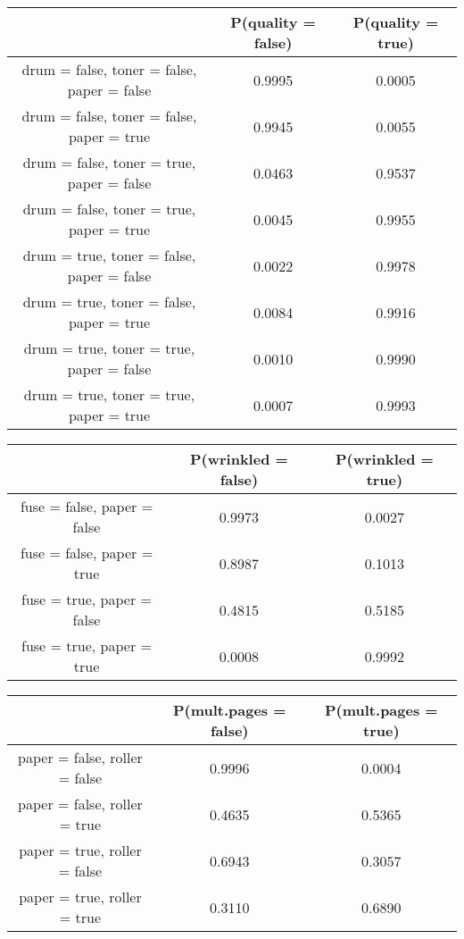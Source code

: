 \begin{table}[h!]
	\begin{tabular}{|c|c|c|}
		\hline
		& P(quality = false) & P(quality = true) \\ \hline
		drum = false, toner = false, paper = false & 0.9995 & 0.0005 \\ \hline
		drum = false, toner = false, paper = true & 0.9945 & 0.0055 \\ \hline
		drum = false, toner = true, paper = false & 0.0463 & 0.9537 \\ \hline
		drum = false, toner = true, paper = true & 0.0045 & 0.9955 \\ \hline
		drum = true, toner = false, paper = false & 0.0022 & 0.9978 \\ \hline
		drum = true, toner = false, paper = true & 0.0084 & 0.9916 \\ \hline
		drum = true, toner = true, paper = false & 0.0010 & 0.9990 \\ \hline
		drum = true, toner = true, paper = true & 0.0007 & 0.9993 \\ \hline
	\end{tabular}
\end{table}

\begin{table}[h!]
	\begin{tabular}{|c|c|c|}
		\hline
		& P(wrinkled = false) & P(wrinkled = true) \\ \hline
		fuse = false, paper = false & 0.9973 & 0.0027 \\ \hline
		fuse = false, paper = true & 0.8987 & 0.1013 \\ \hline
		fuse = true, paper = false & 0.4815 & 0.5185 \\ \hline
		fuse = true, paper = true & 0.0008 & 0.9992 \\ \hline
	\end{tabular}
\end{table}

\begin{table}[h!]
	\begin{tabular}{|c|c|c|}
		\hline
		& P(mult.pages = false) & P(mult.pages = true) \\ \hline
		paper = false, roller = false & 0.9996 & 0.0004 \\ \hline
		paper = false, roller = true & 0.4635 & 0.5365 \\ \hline
		paper = true, roller = false & 0.6943 & 0.3057 \\ \hline
		paper = true, roller = true & 0.3110 & 0.6890 \\ \hline
	\end{tabular}
\end{table}

